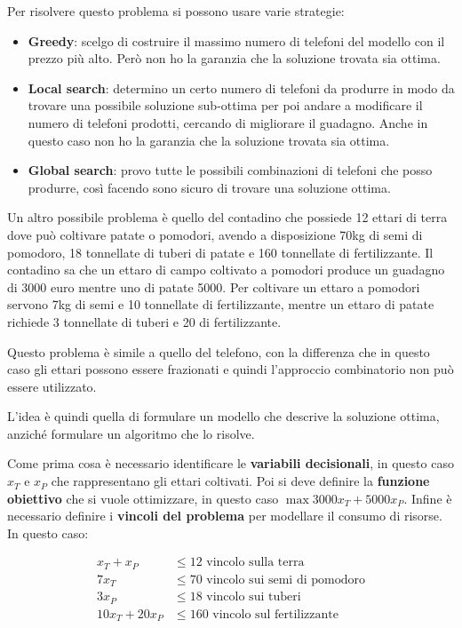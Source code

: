 Per risolvere questo problema si possono usare varie strategie:

\begin{itemize}
	\item \textbf{Greedy}: scelgo di costruire il massimo numero di telefoni del modello con il prezzo più alto. Però non ho la garanzia che la soluzione trovata sia ottima.
	\item \textbf{Local search}: determino un certo numero di telefoni da produrre in modo da trovare una possibile soluzione sub-ottima per poi andare a modificare il numero di telefoni prodotti, cercando di migliorare il guadagno. Anche in questo caso non ho la garanzia che la soluzione trovata sia ottima.
	\item \textbf{Global search}: provo tutte le possibili combinazioni di telefoni che posso produrre, così facendo sono sicuro di trovare una soluzione ottima.
\end{itemize}


Un altro possibile problema è quello del contadino che possiede 12 ettari di terra dove può coltivare patate o pomodori, avendo a disposizione 70kg di semi di pomodoro, 18 tonnellate di tuberi di patate e 160 tonnellate di fertilizzante. Il contadino sa che un ettaro di campo coltivato a pomodori produce un guadagno di 3000 euro mentre uno di patate 5000. Per coltivare un ettaro a pomodori servono 7kg di semi e 10 tonnellate di fertilizzante, mentre un ettaro di patate richiede 3 tonnellate di tuberi e 20 di fertilizzante.

Questo problema è simile a quello del telefono, con la differenza che in questo caso gli ettari possono essere frazionati e quindi l'approccio combinatorio non può essere utilizzato.

L'idea è quindi quella di formulare un modello che descrive la soluzione ottima, anziché formulare un algoritmo che lo risolve.

Come prima cosa è necessario identificare le \textbf{variabili decisionali}, in questo caso $x_T$ e $x_P$ che rappresentano gli ettari coltivati. 
Poi si deve definire la \textbf{funzione obiettivo} che si vuole ottimizzare, in questo caso $\max 3000 x_T + 5000 x_P$.
Infine è necessario definire i \textbf{vincoli del problema} per modellare il consumo di risorse. In questo caso:

\begin{align*}
	x_T + x_P &\leq 12 \text{ vincolo sulla terra} \\
	7 x_T &\leq 70   \text{ vincolo sui semi di pomodoro} \\
	3 x_P &\leq 18 \text{ vincolo sui tuberi} \\
	10 x_T + 20 x_P &\leq 160 \text{ vincolo sul fertilizzante} 
\end{align*}

